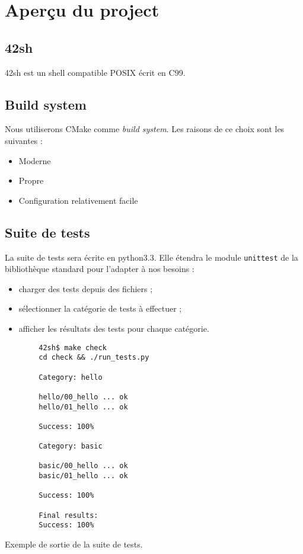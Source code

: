 \section{Aperçu du project}

\subsection{42sh}

42sh est un shell compatible POSIX écrit en C99.

\subsection{Build system}

Nous utiliserons CMake comme \emph{build system}. Les raisons de ce choix
sont les suivantes :
\begin{itemize}
    \item Moderne
    \item Propre
    \item Configuration relativement facile
\end{itemize}

\subsection{Suite de tests}

La suite de tests sera écrite en python3.3. Elle étendra le module
\texttt{unittest} de la bibliothèque standard pour l'adapter à nos besoins :

\begin{itemize}
    \item charger des tests depuis des fichiers ;
    \item sélectionner la catégorie de tests à effectuer ;
    \item afficher les résultats des tests pour chaque catégorie.
\end{itemize}

\begin{listing}[H]
    \begin{verbatim}
        42sh$ make check
        cd check && ./run_tests.py

        Category: hello

        hello/00_hello ... ok
        hello/01_hello ... ok

        Success: 100%

        Category: basic

        basic/00_hello ... ok
        basic/01_hello ... ok

        Success: 100%

        Final results:
        Success: 100%
    \end{verbatim}
    \caption{Exemple de sortie de la suite de tests.}
\end{listing}

